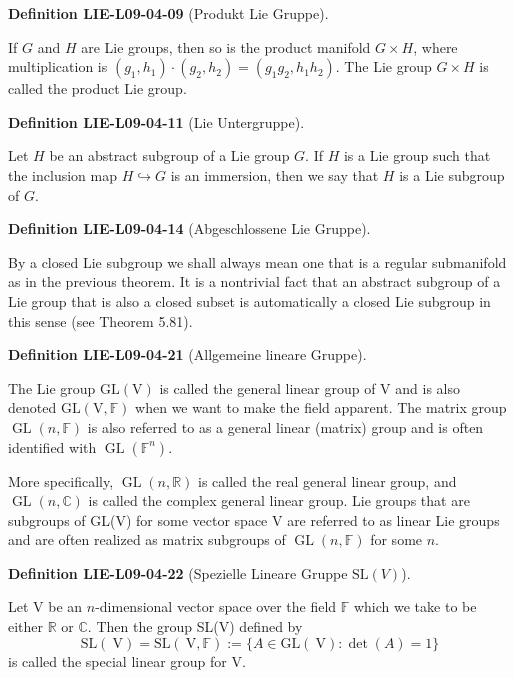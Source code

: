 \documentclass[10pt, letterpaper]{article}
\newcommand{\SL}{\mathrm{SL}}
\newcommand{\CustomHeading}[3]{%
  \par\medskip\noindent%
  \textbf{#1 #2} \textnormal{(#3)}.\enskip%
}
\newenvironment{DEF}[2]{\CustomHeading{Definition}{#1}{#2}}{}
\begin{document}
\begin{DEF}{LIE-L09-04-09}{Produkt Lie Gruppe}
If $G$ and $H$ are Lie groups, then so is the product manifold $G \times H$, where multiplication is $\left(g_{1}, h_{1}\right) \cdot\left(g_{2}, h_{2}\right)=\left(g_{1} g_{2}, h_{1} h_{2}\right)$. The Lie group $G \times H$ is called the product Lie group.
\end{DEF}

\begin{DEF}{LIE-L09-04-11}{Lie Untergruppe}
Let $H$ be an abstract subgroup of a Lie group $G$. If $H$ is a Lie group such that the inclusion map $H \hookrightarrow G$ is an immersion, then we say that $H$ is a Lie subgroup of $G$.
\end{DEF}

\begin{DEF}{LIE-L09-04-14}{Abgeschlossene Lie Gruppe}
By a closed Lie subgroup we shall always mean one that is a regular submanifold as in the previous theorem. It is a nontrivial fact that an abstract subgroup of a Lie group that is also a closed subset is automatically a closed Lie subgroup in this sense (see Theorem 5.81).
\end{DEF}

\begin{DEF}{LIE-L09-04-21}{Allgemeine lineare Gruppe}
The Lie group $\mathrm{GL}(\mathrm{V})$ is called the general linear group of V and is also denoted $\mathrm{GL}(\mathrm{V}, \mathbb{F})$ when we want to make the field apparent. The matrix group $\operatorname{GL}(n, \mathbb{F})$ is also referred to as a general linear (matrix) group and is often identified with $\operatorname{GL}\left(\mathbb{F}^{n}\right)$.


More specifically, $\operatorname{GL}(n, \mathbb{R})$ is called the real general linear group, and $\operatorname{GL}(n, \mathbb{C})$ is called the complex general linear group. Lie groups that are subgroups of GL(V) for some vector space V are referred to as linear Lie groups and are often realized as matrix subgroups of $\operatorname{GL}(n, \mathbb{F})$ for some $n$.
\end{DEF}

\begin{DEF}{LIE-L09-04-22}{Spezielle Lineare Gruppe $\SL(V)$}
Let V be an $n$-dimensional vector space over the field $\mathbb{F}$ which we take to be either $\mathbb{R}$ or $\mathbb{C}$. Then the group SL(V) defined by
$$
\mathrm{SL}(\mathrm{~V})=\mathrm{SL}(\mathrm{~V}, \mathbb{F}):=\{A \in \mathrm{GL}(\mathrm{~V}): \operatorname{det}(A)=1\}
$$
is called the special linear group for V.
\end{DEF}
\end{document}

